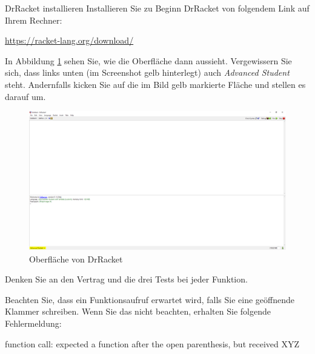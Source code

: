 \documentclass{../tuda-exercise}
\begin{document}
  \maketitle

  \begin{task}{DrRacket installieren}
    Installieren Sie zu Beginn DrRacket von folgendem Link auf Ihrem Rechner:

    \begin{center}
      \url{https://racket-lang.org/download/}
    \end{center}

    In Abbildung \ref{fig:V1} sehen Sie, wie die Oberfläche dann aussieht. Vergewissern Sie sich,
    dass links unten (im Screenshot gelb hinterlegt) auch \textit{Advanced Student} steht.
    Andernfalls kicken Sie auf die im Bild gelb markierte Fläche und stellen es darauf um.

    \begin{figure}[h]
      \centering
      \includegraphics[width=\linewidth]{graphics/gui_drracket.png}
      \caption{Oberfläche von DrRacket}
      \label{fig:V1}
    \end{figure}
  \end{task}

  \clearpage

  \begin{note}[title=Wichtig:, color=tuda-red]
    Denken Sie an den Vertrag und die drei Tests bei jeder Funktion.
  \end{note}

  \begin{note}[title=Achtung:, color=tuda-red]
    Beachten Sie, dass ein Funktionsaufruf erwartet wird, falls Sie eine geöffnende Klammer
    schreiben. Wenn Sie das nicht beachten, erhalten Sie folgende Fehlermeldung:

    \begin{center}
      function call: expected a function after the open parenthesis, but received XYZ
    \end{center}
  \end{note}
\end{document}
